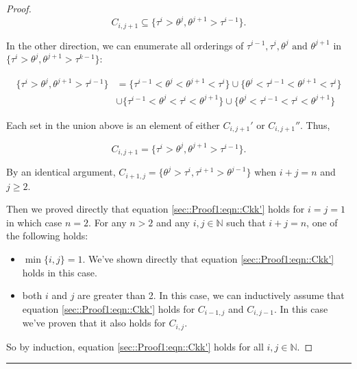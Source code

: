 \documentclass[12pt]{article}
\newcommand{\mb}{\mathbb}
\newcommand{\te}{\text}
\newcommand{\lin}{\rule{\linewidth}{0.4 pt}}
\newcommand{\rt}[1]{\tau^{#1}}						%
\newcommand{\rtt}[1]{\theta^{#1}}					%
\renewcommand{\it}{k}								%
\newcommand{\itt}{i}								%
\newcommand{\ittt}{j}								%
\newcommand{\numb}{n}								%
\newcommand{\pathsete}[2]{C_{#1,#2}}			%
\begin{document}
\begin{proof}
\[\pathsete{\itt}{\ittt+1} \subseteq \{\rt{\itt} > \rtt{\ittt},\rtt{\ittt+1} > \rt{\itt-1}\}.\]

In the other direction, we can enumerate all orderings of \(\rt{\itt-1},\rt{\itt},\rtt{\ittt}\te{ and } \rtt{\ittt+1}\) in \(\{\rt{\itt} > \rtt{\ittt}, \rtt{\ittt+1} > \rt{\it-1}\}\):

\begin{align*}
\{\rt{\itt} > \rtt{\ittt},\rtt{\ittt+1} > \rt{\itt-1}\} &= \{\rt{\itt-1} < \rtt{\ittt} < \rtt{\ittt+1} < \rt{\itt}\} \cup \{\rtt{\ittt} < \rt{\itt-1} < \rtt{\ittt+1} < \rt{\itt}\}\\
&\cup \{\rt{\itt-1} < \rtt{\ittt} < \rt{\itt} < \rtt{\ittt+1}\} \cup \{\rtt{\ittt} < \rt{\itt-1} <\rt{\itt} < \rtt{\ittt+1}\}
\end{align*}

Each set in the union above is an element of either \(\pathsete{\itt}{\ittt+1}'\) or \(\pathsete{\itt}{\ittt+1}''\). Thus,

\[\pathsete{\itt}{\ittt+1} = \{\rt{\itt} > \rtt{\ittt},\rtt{\ittt+1} > \rt{\itt-1}\}.\]

By an identical argument, \(\pathsete{\itt+1}{\ittt} = \{\rtt{\ittt} > \rt{\itt},\rt{\itt+1} > \rtt{\ittt-1}\}\) when \(\itt + \ittt = \numb\) and \(\ittt \geq 2\).

Then we proved directly that equation \eqref{sec::Proof1:eqn::Ckk'} holds for \(\itt = \ittt=1\) in which case \(\numb = 2\). For any \(\numb > 2\) and any \(\itt,\ittt\in \mb{N}\) such that \(\itt + \ittt = \numb\), one of the following holds:

\begin{itemize}
\item \(\min\{\itt,\ittt\} = 1\). We've shown directly that equation \eqref{sec::Proof1:eqn::Ckk'} holds in this case.

\item both \(\itt\) and \(\ittt\) are greater than 2. In this case, we can inductively assume that equation \eqref{sec::Proof1:eqn::Ckk'} holds for \(\pathsete{\itt-1}{\ittt}\) and \(\pathsete{\itt}{\ittt-1}\). In this case we've proven that it also holds for \(\pathsete{\itt}{\ittt}\).
\end{itemize}

So by induction, equation \eqref{sec::Proof1:eqn::Ckk'} holds for all \(\itt,\ittt\in \mb{N}\).
\end{proof}

\lin
\end{document}
